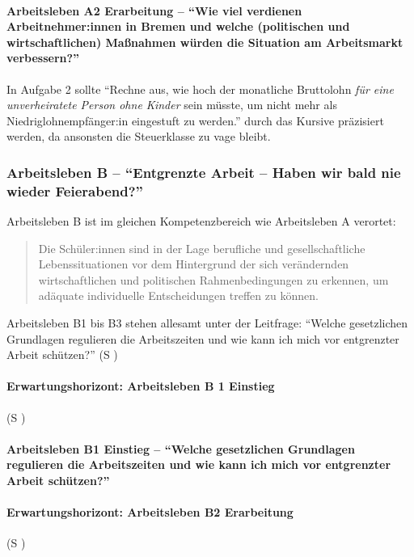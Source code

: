 \paragraph{Arbeitsleben A2 Erarbeitung -- \enquote{Wie viel verdienen Arbeitnehmer:innen in Bremen und welche (politischen und wirtschaftlichen) Maßnahmen würden die Situation am Arbeitsmarkt verbessern?}}

In Aufgabe 2 sollte \enquote{Rechne aus, wie hoch der monatliche Bruttolohn \emph{für eine unverheiratete Person ohne Kinder} sein müsste, um nicht mehr als Niedriglohnempfänger:in eingestuft zu werden.} durch das Kursive präzisiert werden, da ansonsten die Steuerklasse zu vage bleibt. 




\subsubsection{Arbeitsleben B -- \enquote{Entgrenzte Arbeit – Haben wir bald nie wieder Feierabend?}}
Arbeitsleben B ist im gleichen Kompetenzbereich wie Arbeitsleben A verortet: 
\begin{quotation}
    Die Schüler:innen sind in der Lage berufliche und gesellschaftliche Lebenssituationen vor dem Hintergrund der sich verändernden wirtschaftlichen und politischen Rahmenbedingungen zu erkennen, um adäquate individuelle Entscheidungen treffen zu können.

    \autocite[18]{bplan}
\end{quotation}

Arbeitsleben B1 bis B3 stehen allesamt unter der Leitfrage:
\enquote{Welche gesetzlichen Grundlagen regulieren die Arbeitszeiten und wie kann ich mich vor entgrenzter Arbeit schützen?} (\gls{S} \pageref{ARBEITSLEBEN-B1})


\paragraph{Erwartungshorizont: Arbeitsleben B 1 Einstieg} (\gls{S} \pageref{ARBEITSLEBEN-B1})

\paragraph{Arbeitsleben B1 Einstieg -- \enquote{Welche gesetzlichen Grundlagen regulieren die Arbeitszeiten und wie kann ich mich vor entgrenzter Arbeit schützen?}}



\paragraph{Erwartungshorizont: Arbeitsleben B2 Erarbeitung} (\gls{S} \pageref{ARBEITSLEBEN-B2})

